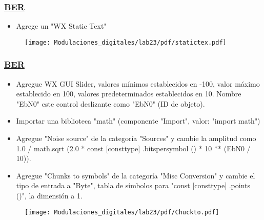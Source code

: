 
\begin{frame}

\frametitle{\underline{\textbf{BER}}}
    \begin{itemize}
        \item{Agrege un "WX Static Text"}
    \end{itemize}
\begin{figure}[H]
\vspace{-3mm}
\centering
\texttt{[image: Modulaciones\_digitales/lab23/pdf/statictex.pdf]}
\end{figure}
\end{frame}


\begin{frame}

\frametitle{\underline{\textbf{BER}}}
\begin{itemize}
    \item {Agregue WX GUI Slider, valores mínimos establecidos en -100, valor máximo establecido en 100, valores predeterminados establecidos en 10. Nombre "EbN0"
este control deslizante como "EbN0" (ID de objeto).}
\item{Importar una biblioteca "math" (componente "Import", valor: "import math")}
\item{Agregue "Noise source" de la categoría "Sources" y cambie la amplitud como
1.0 / math.sqrt (2.0 * const [consttype] .bitspersymbol () * 10 ** (EbN0 / 10)).}
   \item{Agregue "Chunks to symbols" de la categoría "Misc Conversion" y cambie el tipo de entrada a "Byte", tabla de símbolos para "const [consttype] .points ()", la dimensión a 1.}
\end{itemize}
\end{frame}


\begin{frame}
\begin{figure}[H]
\vspace{-3mm}
\centering
\texttt{[image: Modulaciones\_digitales/lab23/pdf/Chuckto.pdf]}
\end{figure}
\end{frame}

